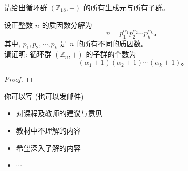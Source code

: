 \documentclass[a4paper, justified]{tufte-handout}
\begin{document}
\begin{problem}
  请给出循环群 $(\mathbb{Z}_{18}, +)$ 的所有生成元与所有子群。
\end{problem}

\begin{solution}
\end{solution}

\begin{problem}
  设正整数 $n$ 的质因数分解为
  \[
    n = p_{1}^{\alpha_{1}} p_{2}^{\alpha_{2}} \cdots p_{k}^{\alpha_{k}}\text{。}
  \]
  其中, $p_{1}, p_{2}, \cdots, p_{k}$ 是 $n$ 的所有不同的质因数。\\[3pt]

  \noindent 请证明: 循环群 $(\mathbb{Z}_{n}, +)$ 的子群的个数为
  \[
    (\alpha_{1} + 1)(\alpha_{2} + 1) \cdots (\alpha_{k} + 1)\text{。}
  \]
\end{problem}

\begin{proof}
\end{proof}


\beginfb

你可以写 (也可以发邮件)
\begin{itemize}
  \item 对课程及教师的建议与意见
  \item 教材中不理解的内容
  \item 希望深入了解的内容
  \item $\cdots$
\end{itemize}
\end{document}
